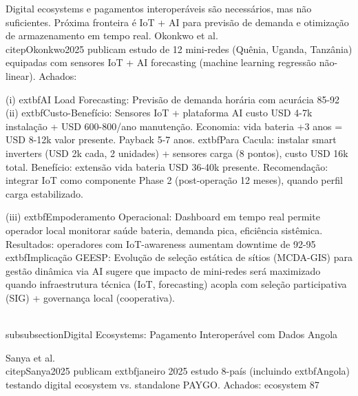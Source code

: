 \documentclass[12pt, a4paper]{article}
\begin{document}
{{{{{{{{{{{Digital ecosystems e pagamentos interoperáveis são necessários, mas não suficientes. Próxima fronteira é IoT + AI para previsão de demanda e otimização de armazenamento em tempo real. Okonkwo et al.~\\citep{Okonkwo2025} publicam estudo de 12 mini-redes (Quênia, Uganda, Tanzânia) equipadas com sensores IoT + AI forecasting (machine learning regressão não-linear). Achados: 

(i) 	extbf{AI Load Forecasting}: Previsão de demanda horária com acurácia 85-92\\%

(ii) 	extbf{Custo-Benefício}: Sensores IoT + plataforma AI custo USD 4-7k instalação + USD 600-800/ano manutenção. Economia: vida bateria +3 anos = USD 8-12k valor presente. Payback 5-7 anos. 	extbf{Para Cacula}: instalar smart inverters (USD 2k cada, 2 unidades) + sensores carga (8 pontos), custo USD 16k total. Benefício: extensão vida bateria USD 36-40k presente. Recomendação: integrar IoT como componente Phase 2 (post-operação 12 meses), quando perfil carga estabilizado.

(iii) 	extbf{Empoderamento Operacional}: Dashboard em tempo real permite operador local monitorar saúde bateria, demanda pica, eficiência sistêmica. Resultados: operadores com IoT-awareness aumentam downtime de 92-95\\%

	extbf{Implicação GEESP}: Evolução de seleção estática de sítios (MCDA-GIS) para gestão dinâmica via AI sugere que impacto de mini-redes será maximizado quando infraestrutura técnica (IoT, forecasting) acopla com seleção participativa (SIG) + governança local (cooperativa).

\\subsubsection{Digital Ecosystems: Pagamento Interoperável com Dados Angola}

Sanya et al.~\\citep{Sanya2025} publicam 	extbf{janeiro 2025} estudo 8-país (incluindo 	extbf{Angola}) testando digital ecosystem vs. standalone PAYGO. Achados: ecosystem 87\\%

}}}}}}}}}}}
\end{document}
